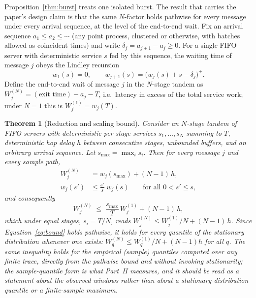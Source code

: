 \documentclass[11pt]{article}
\newtheorem{theorem}{Theorem}
\begin{document}
Proposition~\ref{thm:burst} treats one isolated burst. The result that carries the paper's
design claim is that the same $N$-factor holds pathwise for every message under every
arrival sequence, at the level of the end-to-end wait. Fix an arrival sequence $a_1 \le
a_2 \le \cdots$ (any point process, clustered or otherwise, with batches allowed as
coincident times) and write $\delta_j = a_{j+1} - a_j \ge 0$. For a single FIFO server
with deterministic service $s$ fed by this sequence, the waiting time of message $j$ obeys
the Lindley recursion \citep{lindley1952}
\begin{equation}
w_1(s) = 0, \qquad w_{j+1}(s) = \big(w_j(s) + s - \delta_j\big)^+ .
\label{eq:lindley}
\end{equation}
Define the end-to-end wait of message $j$ in the $N$-stage tandem as $W_j^{(N)} =
(\text{exit time}) - a_j - T$, i.e.\ latency in excess of the total service work; under $N
= 1$ this is $W_j^{(1)} = w_j(T)$.

\begin{theorem}[Reduction and scaling bound]
\label{thm:reduction}
Consider an $N$-stage tandem of FIFO servers with deterministic per-stage services $s_1,
\ldots, s_N$ summing to $T$, deterministic hop delay $h$ between consecutive stages,
unbounded buffers, and an arbitrary arrival sequence. Let $s_{\max} = \max_i s_i$. Then
for every message $j$ and every sample path,
\begin{align}
W_j^{(N)} &= w_j(s_{\max}) + (N-1)\,h, \label{eq:reduction} \\
w_j(s') &\le \frac{s'}{s}\; w_j(s) \qquad \text{for all } 0 < s' \le s, \label{eq:scaling}
\end{align}
and consequently
\begin{equation}
W_j^{(N)} \;\le\; \frac{s_{\max}}{T}\, W_j^{(1)} + (N-1)\,h ,
\label{eq:bound}
\end{equation}
which under equal stages, $s_i = T/N$, reads $W_j^{(N)} \le W_j^{(1)}/N + (N-1)\,h$.
Since Equation~\eqref{eq:bound} holds pathwise, it holds for every quantile of the
stationary distribution whenever one exists: $W_q^{(N)} \le W_q^{(1)}/N + (N-1)h$ for all
$q$. The same inequality holds for the empirical (sample) quantiles computed over any
finite trace, directly from the pathwise bound and without invoking stationarity; the
sample-quantile form is what Part~II measures, and it should be read as a statement about
the observed windows rather than about a stationary-distribution quantile or a
finite-sample maximum.
\end{theorem}
\end{document}
